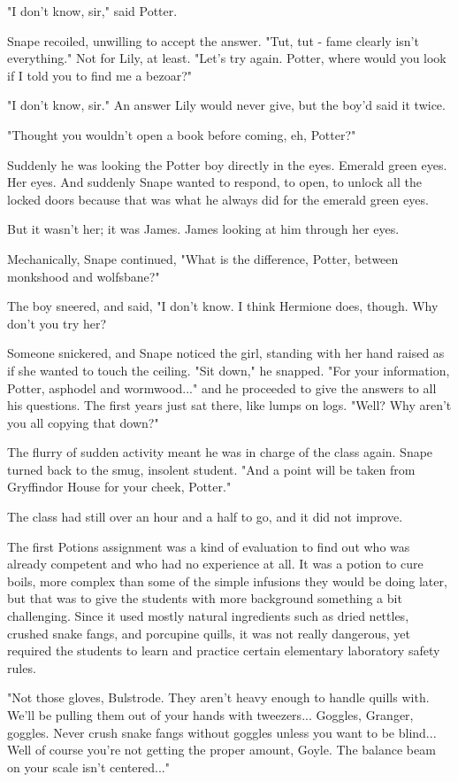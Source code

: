 "I don't know, sir," said Potter.

Snape recoiled, unwilling to accept the answer. "Tut, tut - fame clearly isn't everything." Not for Lily, at least. "Let's try again. Potter, where would you look if I told you to find me a bezoar?"

"I don't know, sir." An answer Lily would never give, but the boy'd said it twice.

"Thought you wouldn't open a book before coming, eh, Potter?"

Suddenly he was looking the Potter boy directly in the eyes. Emerald green eyes. Her eyes. And suddenly Snape wanted to respond, to open, to unlock all the locked doors because that was what he always did for the emerald green eyes.

But it wasn't her; it was James. James looking at him through her eyes.

Mechanically, Snape continued, "What is the difference, Potter, between monkshood and wolfsbane?"

The boy sneered, and said, "I don't know. I think Hermione does, though. Why don't you try her?

Someone snickered, and Snape noticed the girl, standing with her hand raised as if she wanted to touch the ceiling. "Sit down," he snapped. "For your information, Potter, asphodel and wormwood..." and he proceeded to give the answers to all his questions. The first years just sat there, like lumps on logs. "Well? Why aren't you all copying that down?"

The flurry of sudden activity meant he was in charge of the class again. Snape turned back to the smug, insolent student. "And a point will be taken from Gryffindor House for your cheek, Potter."

The class had still over an hour and a half to go, and it did not improve.

The first Potions assignment was a kind of evaluation to find out who was already competent and who had no experience at all. It was a potion to cure boils, more complex than some of the simple infusions they would be doing later, but that was to give the students with more background something a bit challenging. Since it used mostly natural ingredients such as dried nettles, crushed snake fangs, and porcupine quills, it was not really dangerous, yet required the students to learn and practice certain elementary laboratory safety rules.

"Not those gloves, Bulstrode. They aren't heavy enough to handle quills with. We'll be pulling them out of your hands with tweezers... Goggles, Granger, goggles. Never crush snake fangs without goggles unless you want to be blind... Well of course you're not getting the proper amount, Goyle. The balance beam on your scale isn't centered..."

